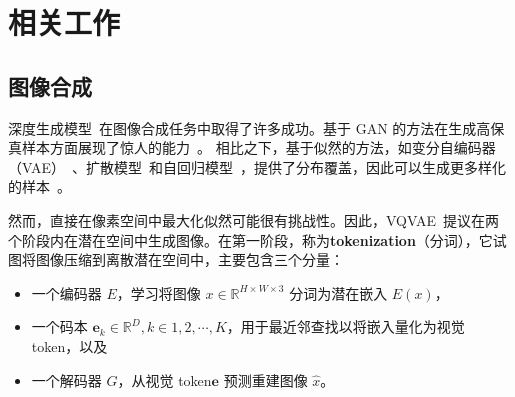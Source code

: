 \section{相关工作}
\label{sec:related}
\subsection{图像合成}\label{sec:related_synthesis}
深度生成模型~\cite{KingmaW14, Vahdat2020nvae, goodfellow2014generative, SAGAN, Song19generative,dhariwal2021diffusion,Oord16pixelcnn, Parmar18imagetransformer}在图像合成任务中取得了许多成功。基于 GAN 的方法在生成高保真样本方面展现了惊人的能力~\cite{goodfellow2014generative, biggan, Karras2019stylegan2, SAGAN, tseng2021regularizing}。
相比之下，基于似然的方法，如变分自编码器（VAE）~\cite{KingmaW14, Vahdat2020nvae}、扩散模型~\cite{Song19generative,dhariwal2021diffusion,ho2021cascaded}和自回归模型~\cite{Oord16pixelcnn, Parmar18imagetransformer}，提供了分布覆盖，因此可以生成更多样化的样本~\cite{Song19generative, Vahdat2020nvae, Oord16pixelcnn}。 

然而，直接在像素空间中最大化似然可能很有挑战性。因此，VQVAE~\cite{Oord17vqvae, Razavi19vqvae2}提议在两个阶段内在潜在空间中生成图像。在第一阶段，称为\textbf{tokenization}（分词），它试图将图像压缩到离散潜在空间中，主要包含三个分量：\vspace{-2.5mm}
\begin{itemize}
    \item 一个编码器 $E$，学习将图像 $x \in \mathbb{R}^{H\times W \times 3}$ 分词为潜在嵌入 $E(x)$，\vspace{-2.5mm}
    \item 一个码本 $\mathbf{e}_k \in \mathbb{R}^D, k\in 1, 2, \cdots, K$，用于最近邻查找以将嵌入量化为视觉 token，以及\vspace{-2.5mm}
    \item 一个解码器 $G$，从视觉 token$\mathbf{e}$ 预测重建图像 $\hat{x}$。
\end{itemize}\vspace{-1mm}

